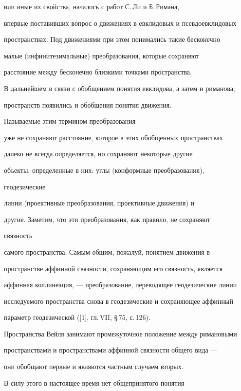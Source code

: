 или иные их свойства, началось с работ С.\,Ли и Б.\,Римана, 


впервые поставивших вопрос о движениях в евклидовых и псевдоевклидовых 


пространствах. Под движениями при этом понимались такие бесконечно 


малые (инфинитезимальные) преобразования, которые сохраняют 


расстояние между бесконечно близкими точками пространства. 


 


В дальнейшем в связи с обобщением понятия евклидова, а затем и риманова, 


пространств появились и обобщения понятия движения. 


Называемые этим термином преобразования 


уже не сохраняют расстояние, которое в этих обобщенных пространствах 


далеко не всегда определяется, но сохраняют некоторые другие 


объекты, определенные в них: углы (конформные преобразования), 


геодезические 


линии (проективные преобразования, проективные движения) и 


другие. Заметим, что эти преобразования, как правило, не сохраняют 


связность 


самого пространства. Самым общим, пожалуй, понятием движения в 


пространстве аффинной связности, сохраняющим его связность, является 


аффинная коллинеация, --- преобразование, переводящее геодезические линии 


исследуемого пространства снова в геодезические и сохраняющее аффинный 


параметр геодезической ([1], гл.\,VII, \S\,75, с.\,126). 


 


Пространства Вейля занимают промежуточное положение между римановыми 


пространствами и пространствами аффинной связности общего вида --- 


они обобщают первые и являются частным случаем вторых. 


В силу этого в настоящее время нет общепринятого понятия 


